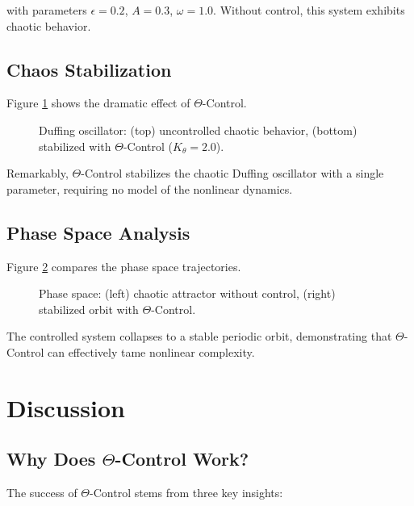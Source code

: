 \documentclass[12pt,a4paper]{article}
\begin{document}
with parameters $\epsilon = 0.2$, $A = 0.3$, $\omega = 1.0$. Without 
control, this system exhibits chaotic behavior.

\subsection{Chaos Stabilization}

Figure \ref{fig:duffing} shows the dramatic effect of $\Theta$-Control.

\begin{figure}[H]
\centering
\caption{Duffing oscillator: (top) uncontrolled chaotic behavior, 
(bottom) stabilized with $\Theta$-Control ($K_\theta=2.0$).}
\label{fig:duffing}
\end{figure}

Remarkably, $\Theta$-Control stabilizes the chaotic Duffing 
oscillator with a single parameter, requiring no model of the 
nonlinear dynamics.

\subsection{Phase Space Analysis}

Figure \ref{fig:phasespace} compares the phase space trajectories.

\begin{figure}[H]
\centering
\caption{Phase space: (left) chaotic attractor without control, 
(right) stabilized orbit with $\Theta$-Control.}
\label{fig:phasespace}
\end{figure}

The controlled system collapses to a stable periodic orbit, 
demonstrating that $\Theta$-Control can effectively tame 
nonlinear complexity.

\section{Discussion}

\subsection{Why Does $\Theta$-Control Work?}

The success of $\Theta$-Control stems from three key insights:
\end{document}
